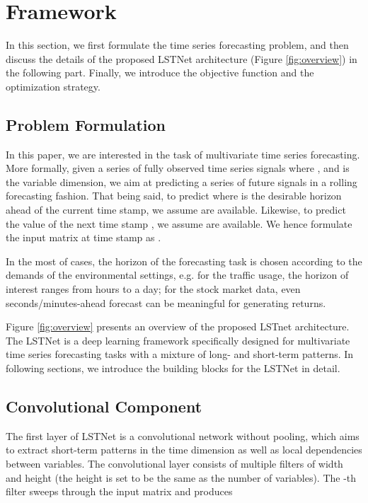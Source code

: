 \documentclass[sigconf]{acmart}
\begin{document}
 \section{Framework}
\label{sec:model}

In this section, we first formulate the time series forecasting problem, and then discuss the details of the proposed LSTNet architecture (Figure \ref{fig:overview}) in the following part. Finally, we introduce the objective function and the optimization strategy.
\subsection{Problem Formulation}
\label{sec:format}

In this paper, we are interested in the task of multivariate time series forecasting. More formally, given a series of fully observed time series signals  where , and  is the variable dimension, we aim at predicting a series of future signals in a rolling forecasting fashion. That being said, to predict  where  is the desirable horizon ahead of the current time stamp, we assume  are available. Likewise, to predict the  value of the next time stamp , we assume  are available. We hence formulate the input matrix at time stamp  as . 

In the most of cases, the horizon of the forecasting task is chosen according to the demands of the environmental settings, e.g. for the traffic usage, the horizon of interest ranges from hours to a day; for the stock market data, even seconds/minutes-ahead forecast can be meaningful for generating returns.

Figure \ref{fig:overview} presents an overview of the proposed LSTnet architecture. The LSTNet is a deep learning framework specifically designed for multivariate time series forecasting tasks with a mixture of long- and short-term patterns. In following sections, we introduce the building blocks for the LSTNet in detail. 

\subsection{Convolutional Component}
The first layer of LSTNet is a convolutional network without pooling, which aims to extract short-term patterns in the time dimension as well as local dependencies between variables. The convolutional layer consists of multiple filters
of width  and height  (the height is set to be the same as the number of variables). The -th filter sweeps through the input matrix  and produces
\end{document}

